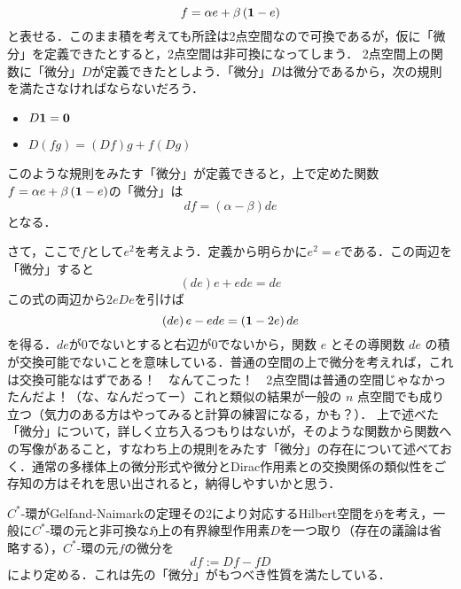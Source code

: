 \[f=\alpha e+\beta \left({\bf 1}-e\right)\]
と表せる．このまま積を考えても所詮は2点空間なので可換であるが，仮に「微分」を定義できたとすると，2点空間は非可換になってしまう．
2点空間上の関数に「微分」$D$が定義できたとしよう．「微分」$D$は微分であるから，次の規則を満たさなければならないだろう．
\begin{itemize}
\item$D{\bf 1}={\bf 0}$
\item$D(fg)=\left(Df\right)g+f\left(Dg\right)$
\end{itemize}
このような規則をみたす「微分」が定義できると，上で定めた関数$f=\alpha e+\beta \left({\bf 1}-e\right)$の「微分」は
\[df=\left(\alpha-\beta\right)de\]
となる．

さて，ここで$f$として$e^2$を考えよう．定義から明らかに$e^2=e$である．この両辺を「微分」すると
\[\left(de\right)e+ede=de\]
この式の両辺から$2eDe$を引けば
\[\left(de\right)e-ede=\left({\bf 1}-2e\right)de\]
を得る．$de$が0でないとすると右辺が$0$でないから，関数 $e$ とその導関数 $de$ の積が交換可能でないことを意味している．普通の空間の上で微分を考えれば，これは交換可能なはずである！　なんてこった！　2点空間は普通の空間じゃなかったんだよ！（な、なんだってー）これと類似の結果が一般の $n$ 点空間でも成り立つ（気力のある方はやってみると計算の練習になる，かも？）．
上で述べた「微分」について，詳しく立ち入るつもりはないが，そのような関数から関数への写像があること，すなわち上の規則をみたす「微分」の存在について述べておく．通常の多様体上の微分形式や微分とDirac作用素との交換関係の類似性をご存知の方はそれを思い出されると，納得しやすいかと思う．

$C^*$-環がGelfand-Naimarkの定理その2により対応するHilbert空間を$\mathfrak{H}$を考え，一般に$C^*$-環の元と非可換な$\mathfrak{H}$上の有界線型作用素$D$を一つ取り（存在の議論は省略する），$C^*$-環の元$f$の微分を
\[df:=Df-fD\]
により定める．これは先の「微分」がもつべき性質を満たしている．

